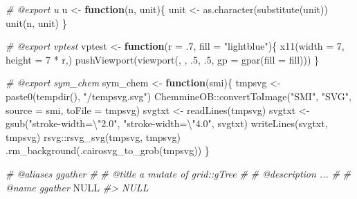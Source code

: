 \documentclass[
]{article}
\newenvironment{Shaded}{\begin{snugshade}}{\end{snugshade}}
\newcommand{\AttributeTok}[1]{\textcolor[rgb]{0.77,0.63,0.00}{#1}}
\newcommand{\CommentTok}[1]{\textcolor[rgb]{0.56,0.35,0.01}{\textit{#1}}}
\newcommand{\ConstantTok}[1]{\textcolor[rgb]{0.00,0.00,0.00}{#1}}
\newcommand{\ControlFlowTok}[1]{\textcolor[rgb]{0.13,0.29,0.53}{\textbf{#1}}}
\newcommand{\DecValTok}[1]{\textcolor[rgb]{0.00,0.00,0.81}{#1}}
\newcommand{\FunctionTok}[1]{\textcolor[rgb]{0.00,0.00,0.00}{#1}}
\newcommand{\NormalTok}[1]{#1}
\newcommand{\OtherTok}[1]{\textcolor[rgb]{0.56,0.35,0.01}{#1}}
\newcommand{\SpecialCharTok}[1]{\textcolor[rgb]{0.00,0.00,0.00}{#1}}
\newcommand{\StringTok}[1]{\textcolor[rgb]{0.31,0.60,0.02}{#1}}
\begin{document}
\begin{Shaded}
\begin{Highlighting}[]
\CommentTok{\#\textquotesingle{} @export u}
\NormalTok{u }\OtherTok{\textless{}{-}} \ControlFlowTok{function}\NormalTok{(n, unit)\{}
\NormalTok{  unit }\OtherTok{\textless{}{-}} \FunctionTok{as.character}\NormalTok{(}\FunctionTok{substitute}\NormalTok{(unit))}
  \FunctionTok{unit}\NormalTok{(n, unit)}
\NormalTok{\}}

\CommentTok{\#\textquotesingle{} @export vptest}
\NormalTok{vptest }\OtherTok{\textless{}{-}} \ControlFlowTok{function}\NormalTok{(}\AttributeTok{r =}\NormalTok{ .}\DecValTok{7}\NormalTok{, }\AttributeTok{fill =} \StringTok{"lightblue"}\NormalTok{)\{}
  \FunctionTok{x11}\NormalTok{(}\AttributeTok{width =} \DecValTok{7}\NormalTok{, }\AttributeTok{height =} \DecValTok{7} \SpecialCharTok{*}\NormalTok{ r,)}
  \FunctionTok{pushViewport}\NormalTok{(}\FunctionTok{viewport}\NormalTok{(, , .}\DecValTok{5}\NormalTok{, .}\DecValTok{5}\NormalTok{, }\AttributeTok{gp =} \FunctionTok{gpar}\NormalTok{(}\AttributeTok{fill =}\NormalTok{ fill)))}
\NormalTok{\}}

\CommentTok{\#\textquotesingle{} @export sym\_chem}
\NormalTok{sym\_chem }\OtherTok{\textless{}{-}} \ControlFlowTok{function}\NormalTok{(smi)\{}
\NormalTok{  tmpsvg }\OtherTok{\textless{}{-}} \FunctionTok{paste0}\NormalTok{(}\FunctionTok{tempdir}\NormalTok{(), }\StringTok{"/tempsvg.svg"}\NormalTok{)}
\NormalTok{  ChemmineOB}\SpecialCharTok{::}\FunctionTok{convertToImage}\NormalTok{(}\StringTok{"SMI"}\NormalTok{, }\StringTok{"SVG"}\NormalTok{, }\AttributeTok{source =}\NormalTok{ smi, }\AttributeTok{toFile =}\NormalTok{ tmpsvg)}
\NormalTok{  svgtxt }\OtherTok{\textless{}{-}} \FunctionTok{readLines}\NormalTok{(tmpsvg)}
\NormalTok{  svgtxt }\OtherTok{\textless{}{-}} \FunctionTok{gsub}\NormalTok{(}\StringTok{"stroke{-}width=}\SpecialCharTok{\textbackslash{}"}\StringTok{2.0"}\NormalTok{, }\StringTok{"stroke{-}width=}\SpecialCharTok{\textbackslash{}"}\StringTok{4.0"}\NormalTok{, svgtxt)}
  \FunctionTok{writeLines}\NormalTok{(svgtxt, tmpsvg)}
\NormalTok{  rsvg}\SpecialCharTok{::}\FunctionTok{rsvg\_svg}\NormalTok{(tmpsvg, tmpsvg)}
  \FunctionTok{.rm\_background}\NormalTok{(}\FunctionTok{.cairosvg\_to\_grob}\NormalTok{(tmpsvg))}
\NormalTok{\}}

\CommentTok{\#\textquotesingle{} @aliases ggather}
\CommentTok{\#\textquotesingle{}}
\CommentTok{\#\textquotesingle{} @title a mutate of grid::gTree}
\CommentTok{\#\textquotesingle{}}
\CommentTok{\#\textquotesingle{} @description ...}
\CommentTok{\#\textquotesingle{}}
\CommentTok{\#\textquotesingle{} @name ggather}
\ConstantTok{NULL}
\CommentTok{\#\textgreater{} NULL}


\end{Highlighting}
\end{Shaded}
\end{document}
